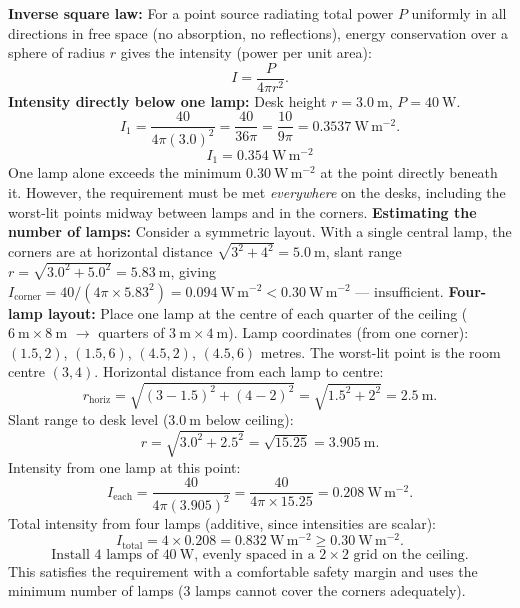 \documentclass[11pt]{article}
\begin{document}
\begin{exoresolu}
\textbf{Inverse square law:} For a point source radiating total power $P$ uniformly in all directions in free space (no absorption, no reflections), energy conservation over a sphere of radius $r$ gives the intensity (power per unit area):
\[
I = \frac{P}{4\pi r^2}.
\]
\textbf{Intensity directly below one lamp:} Desk height $r = 3.0\ \mathrm{m}$, $P = 40\ \mathrm{W}$.
\[
I_1 = \frac{40}{4\pi (3.0)^2} = \frac{40}{36\pi} = \frac{10}{9\pi} = 0.3537\ \mathrm{W\,m^{-2}}.
\]
\[\boxed{I_{1} = 0.354\ \mathrm{W\,m^{-2}}}\]
One lamp alone exceeds the minimum $0.30\ \mathrm{W\,m^{-2}}$ at the point directly beneath it. However, the requirement must be met \emph{everywhere} on the desks, including the worst-lit points midway between lamps and in the corners.
\textbf{Estimating the number of lamps:} Consider a symmetric layout. With a single central lamp, the corners are at horizontal distance $\sqrt{3^2+4^2}=5.0\ \mathrm{m}$, slant range $r = \sqrt{3.0^2+5.0^2} = 5.83\ \mathrm{m}$, giving $I_{\text{corner}} = 40/(4\pi\times 5.83^2) = 0.094\ \mathrm{W\,m^{-2}} < 0.30\ \mathrm{W\,m^{-2}}$ — insufficient.
\textbf{Four-lamp layout:} Place one lamp at the centre of each quarter of the ceiling ($6\ \mathrm{m}\times 8\ \mathrm{m}$ $\rightarrow$ quarters of $3\ \mathrm{m}\times 4\ \mathrm{m}$). Lamp coordinates (from one corner): $(1.5, 2)$, $(1.5, 6)$, $(4.5, 2)$, $(4.5, 6)$ metres. The worst-lit point is the room centre $(3, 4)$. Horizontal distance from each lamp to centre:
\[
r_{\text{horiz}} = \sqrt{(3-1.5)^2 + (4-2)^2} = \sqrt{1.5^2 + 2^2} = 2.5\ \mathrm{m}.
\]
Slant range to desk level ($3.0\ \mathrm{m}$ below ceiling):
\[
r = \sqrt{3.0^2 + 2.5^2} = \sqrt{15.25} = 3.905\ \mathrm{m}.
\]
Intensity from one lamp at this point:
\[
I_{\text{each}} = \frac{40}{4\pi (3.905)^2} = \frac{40}{4\pi \times 15.25} = 0.208\ \mathrm{W\,m^{-2}}.
\]
Total intensity from four lamps (additive, since intensities are scalar):
\[
I_{\text{total}} = 4 \times 0.208 = 0.832\ \mathrm{W\,m^{-2}} \ge 0.30\ \mathrm{W\,m^{-2}}.
\]
\[\boxed{\text{Install 4 lamps of } 40\ \mathrm{W} \text{, evenly spaced in a } 2\times 2 \text{ grid on the ceiling.}}\]
This satisfies the requirement with a comfortable safety margin and uses the minimum number of lamps (3 lamps cannot cover the corners adequately).
\end{exoresolu}
\end{document}

